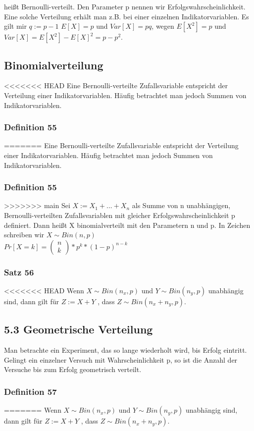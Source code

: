 \documentclass[11pt]{article}
\begin{document}
\begin{enumerate}
\begin{enumerate}
{\begin{enumerate}
\begin{enumerate}
\begin{enumerate}
heißt Bernoulli-verteilt. Den Parameter p nennen wir Erfolgswahrscheinlichkeit.
Eine solche Verteilung erhält man z.B. bei einer einzelnen Indikatorvariablen. Es gilt mir \(q := p-1\)
\(E[X] = p\) und \(Var[X] = pq\),
wegen \(E[X^2] = p\) und \(Var[X] = E[X^2] − E[X]^2 = p − p^2\).
\subsection{Binomialverteilung}
<<<<<<< HEAD
\label{sec:orgfedbb69}
Eine Bernoulli-verteilte Zufallsvariable entspricht der Verteilung einer Indikatorvariablen. Häufig betrachtet man jedoch Summen von Indikatorvariablen.
\subsubsection{Definition 55}
\label{sec:org1f33d87}
=======
\label{sec:orgdbbd7d4}
Eine Bernoulli-verteilte Zufallsvariable entspricht der Verteilung einer Indikatorvariablen. Häufig betrachtet man jedoch Summen von Indikatorvariablen.
\subsubsection{Definition 55}
\label{sec:orgf2a51da}
>>>>>>> main
Sei \(X := X_1 + ... + X_n\) als Summe von n unabhängigen, Bernoulli-verteilten Zufallsvariablen mit gleicher Erfolgswahrscheinlichkeit p definiert. Dann heißt X binomialverteilt mit den Parametern n und p. In Zeichen schreiben wir
\(X \sim Bin(n,p)\) \\
\(Pr[X=k] = \begin{pmatrix} n \\ k \end{pmatrix} * p^k * (1-p)^{n-k}\)
\subsubsection{Satz 56}
<<<<<<< HEAD
\label{sec:orgb686d59}
Wenn \(X \sim Bin(n_x, p)\) und \(Y \sim Bin(n_y, p)\) unabhängig sind, dann gilt für \(Z := X + Y\) , dass \(Z \sim Bin(n_x + n_y, p)\).
\subsection{5.3 Geometrische Verteilung}
\label{sec:org3863e00}
Man betrachte ein Experiment, das so lange wiederholt wird, bis Erfolg eintritt. Gelingt ein einzelner Versuch mit Wahrscheinlichkeit p, so ist die Anzahl der Versuche bis zum Erfolg geometrisch verteilt.
\subsubsection{Definition 57}
\label{sec:org620dda6}
=======
\label{sec:org74cdbe3}
Wenn \(X \sim Bin(n_x, p)\) und \(Y \sim Bin(n_y, p)\) unabhängig sind, dann gilt für \(Z := X + Y\) , dass \(Z \sim Bin(n_x + n_y, p)\).

\end{enumerate}
\end{enumerate}
\end{enumerate}}
\end{enumerate}
\end{enumerate}
\end{document}
